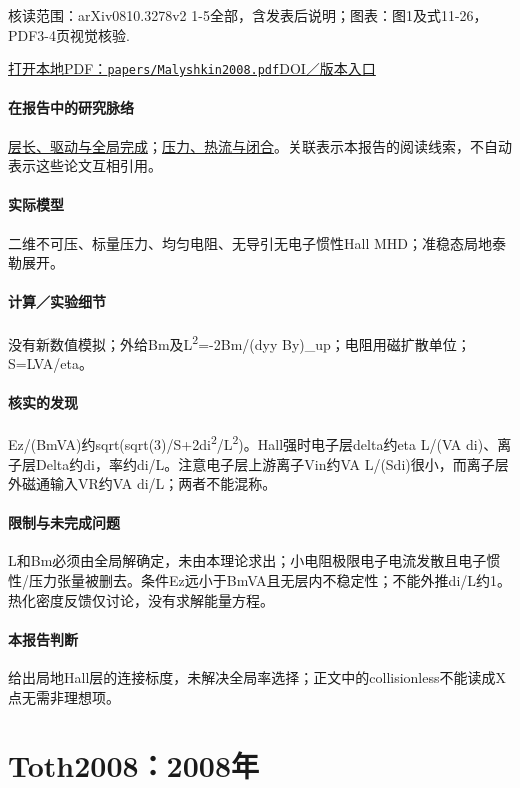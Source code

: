 \textsf{核读范围：}arXiv0810.3278v2 1-5全部，含发表后说明；\textsf{图表：}图1及式11-26，PDF3-4页视觉核验.

\href{run:papers/Malyshkin2008.pdf}{打开本地PDF：\texttt{papers/Malyshkin2008.pdf}}\quad\href{https://doi.org/10.1103/physrevlett.101.225001}{DOI／版本入口}

\paragraph{在报告中的研究脉络}\hyperref[story:global]{层长、驱动与全局完成}；\hyperref[story:closure]{压力、热流与闭合}。关联表示本报告的阅读线索，不自动表示这些论文互相引用。

\paragraph{实际模型}二维不可压、标量压力、均匀电阻、无导引无电子惯性Hall MHD；准稳态局地泰勒展开。

\paragraph{计算／实验细节}没有新数值模拟；外给Bm及L\textsuperscript{2}=-2Bm/(dyy By)\_up；电阻用磁扩散单位；S=LVA/eta。

\paragraph{核实的发现}Ez/(BmVA)约sqrt(sqrt(3)/S+2di\textsuperscript{2}/L\textsuperscript{2})。Hall强时电子层delta约eta L/(VA di)、离子层Delta约di，率约di/L。注意电子层上游离子Vin约VA L/(Sdi)很小，而离子层外磁通输入VR约VA di/L；两者不能混称。

\paragraph{限制与未完成问题}L和Bm必须由全局解确定，未由本理论求出；小电阻极限电子电流发散且电子惯性/压力张量被删去。条件Ez远小于BmVA且无层内不稳定性；不能外推di/L约1。热化密度反馈仅讨论，没有求解能量方程。

\paragraph{本报告判断}给出局地Hall层的连接标度，未解决全局率选择；正文中的collisionless不能读成X点无需非理想项。

\section{Toth2008：2008年}\label{paper:Toth2008}

